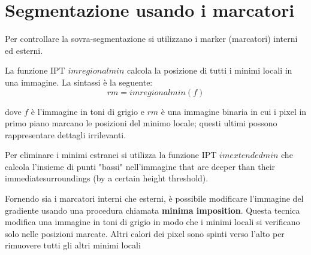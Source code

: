 \section{Segmentazione usando i marcatori}
Per controllare la sovra-segmentazione si utilizzano i marker (marcatori) interni ed esterni.

La funzione IPT $imregionalmin$ calcola la posizione di tutti i minimi locali in una immagine. La sintassi è la seguente:
$$
rm = imregionalmin(f)
$$

dove $f$ è l'immagine in toni di grigio e $rm$ è una immagine binaria in cui i pixel in primo piano marcano le posizioni del minimo locale; questi ultimi possono rappresentare dettagli irrilevanti.

Per eliminare i minimi estranei si utilizza la funzione IPT $imextendedmin$ che calcola l'insieme di punti "bassi" nell'immagine that are deeper than their immediatesurroundings (by a certain height threshold). 

Fornendo sia i marcatori interni che esterni, è possibile modificare l'immagine del gradiente usando una procedura chiamata \textbf{minima imposition}. Questa tecnica modifica una immagine in toni di grigio in modo che i minimi locali si verificano solo nelle posizioni marcate. Altri calori dei pixel sono spinti verso l'alto per rimuovere tutti gli altri minimi locali

